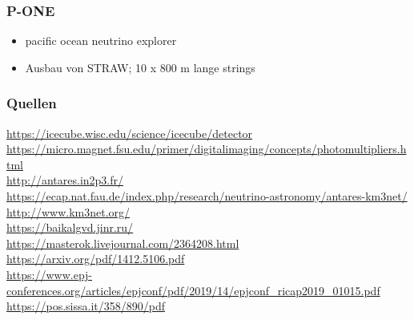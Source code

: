 \documentclass[aspectratio=1610, 9pt]{beamer}
\begin{document}
\begin{frame}\frametitle{P-ONE}
  \begin{itemize}
    \item pacific ocean neutrino explorer
    \item Ausbau von STRAW; 10 x 800 m lange strings
  \end{itemize}
\end{frame}

\begin{frame}\frametitle{Quellen}
\url{https://icecube.wisc.edu/science/icecube/detector} \\
\url{https://micro.magnet.fsu.edu/primer/digitalimaging/concepts/photomultipliers.html} \\
\url{http://antares.in2p3.fr/} \\
\url{https://ecap.nat.fau.de/index.php/research/neutrino-astronomy/antares-km3net/} \\
\url{http://www.km3net.org/} \\
\url{https://baikalgvd.jinr.ru/} \\
\url{https://masterok.livejournal.com/2364208.html} \\
\url{https://arxiv.org/pdf/1412.5106.pdf} \\
\url{https://www.epj-conferences.org/articles/epjconf/pdf/2019/14/epjconf_ricap2019_01015.pdf} \\
\url{https://pos.sissa.it/358/890/pdf} \\

\end{frame}
\end{document}
